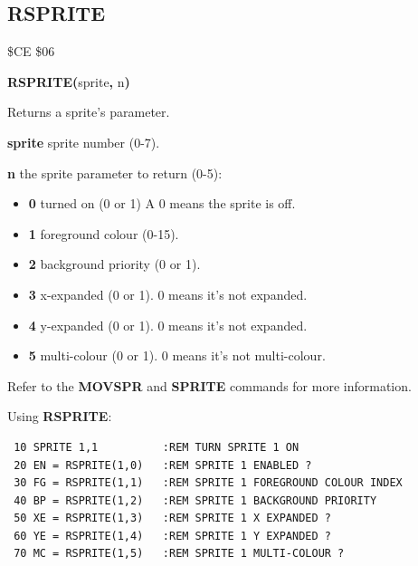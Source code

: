 \subsection{RSPRITE}
\begin{description}[leftmargin=2cm,style=nextline]
\item [Token:] \$CE \$06
\item [Format:] {\bf RSPRITE(}sprite{\bf,} n{\bf)}
\item [Usage:]  Returns a sprite's parameter.

                {\bf sprite} sprite number (0-7).

                {\bf n} the sprite parameter to return (0-5):

                \begin{itemize}
                    \item {\bf 0} turned on (0 or 1) A 0 means the sprite is off.
                    \item {\bf 1} foreground colour (0-15).
                    \item {\bf 2} background priority (0 or 1).
                    \item {\bf 3} x-expanded (0 or 1). 0 means it's not expanded.
                    \item {\bf 4} y-expanded (0 or 1). 0 means it's not expanded.
                    \item {\bf 5} multi-colour (0 or 1).  0 means it's not multi-colour.
                \end{itemize}

\item [Remarks:] Refer to the {\bf MOVSPR} and {\bf SPRITE} commands for more information.

\item [Example:] Using {\bf RSPRITE}:
\begin{tcolorbox}[colback=black,coltext=white]
\verbatimfont{\codefont}
\begin{verbatim}
 10 SPRITE 1,1          :REM TURN SPRITE 1 ON
 20 EN = RSPRITE(1,0)   :REM SPRITE 1 ENABLED ?
 30 FG = RSPRITE(1,1)   :REM SPRITE 1 FOREGROUND COLOUR INDEX
 40 BP = RSPRITE(1,2)   :REM SPRITE 1 BACKGROUND PRIORITY
 50 XE = RSPRITE(1,3)   :REM SPRITE 1 X EXPANDED ?
 60 YE = RSPRITE(1,4)   :REM SPRITE 1 Y EXPANDED ?
 70 MC = RSPRITE(1,5)   :REM SPRITE 1 MULTI-COLOUR ?
\end{verbatim}
\end{tcolorbox}
\end{description}



